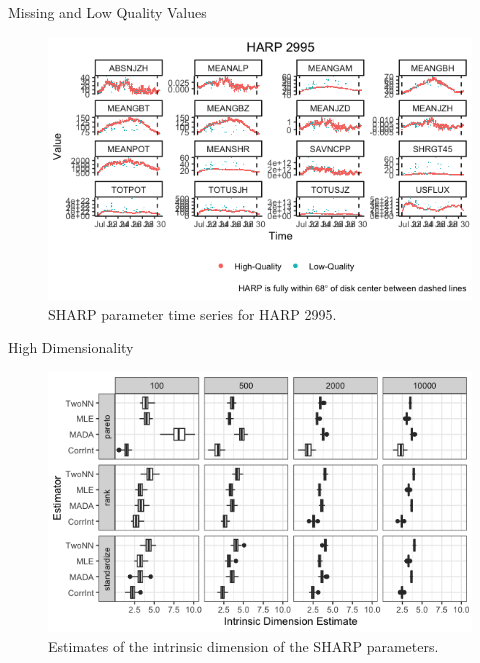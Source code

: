 \documentclass{beamer}
\begin{document}
\begin{frame}{Missing and Low Quality Values}
    \begin{figure}[!htb]
        \centering
        \includegraphics[scale=0.5]{harp2995.png}
        \caption{SHARP parameter time series for HARP 2995.}
        \label{fig:na_props_flux}
    \end{figure}
\end{frame}

\begin{frame}{High Dimensionality}
    \begin{figure}[!htb]
        \centering
        \includegraphics[scale=0.5]{intrinsic_dim_ests.png}
        \caption{Estimates of the intrinsic dimension of the SHARP parameters.}
        \label{fig:intrinsic_dim_ests}
    \end{figure}
\end{frame}
\end{document}
